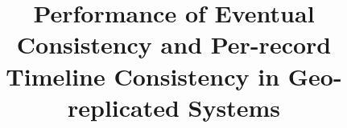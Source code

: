 \documentclass[doublespacing]{bmcart}
\begin{document}
\begin{frontmatter}

\begin{fmbox}


\title{Performance of Eventual Consistency and Per-record Timeline Consistency 
in Geo-replicated Systems}


\author[
   addressref={aff1},                   %
   corref={aff1},                       %
   email={mdediana@ime.usp.br}   %
]{ }
\author[
   addressref={aff1},
   email={gerosa@ime.usp.br}
]{ }


\address[id=aff1]{%
  , %
  ,                     %
  ,                              %
}


\end{fmbox}
\end{frontmatter}
\end{document}
